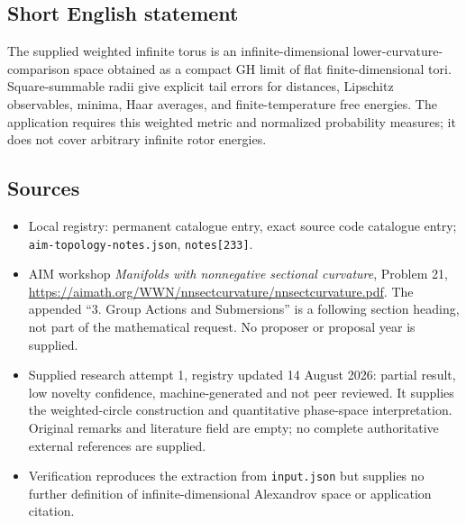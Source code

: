 \documentclass[11pt]{article}
\begin{document}
\subsection{Short English statement}
The supplied weighted infinite torus is an infinite-dimensional lower-curvature-comparison space obtained as a compact GH limit of flat finite-dimensional tori. Square-summable radii give explicit tail errors for distances, Lipschitz observables, minima, Haar averages, and finite-temperature free energies. The application requires this weighted metric and normalized probability measures; it does not cover arbitrary infinite rotor energies.
\subsection{Sources}
\begin{itemize}
\item Local registry: permanent catalogue entry, exact source code catalogue entry; \texttt{aim-topology-notes.json}, \texttt{notes[233]}.
\item AIM workshop \emph{Manifolds with nonnegative sectional curvature}, Problem 21, \url{https://aimath.org/WWN/nnsectcurvature/nnsectcurvature.pdf}. The appended ``3. Group Actions and Submersions'' is a following section heading, not part of the mathematical request. No proposer or proposal year is supplied.
\item Supplied research attempt 1, registry updated 14 August 2026: partial result, low novelty confidence, machine-generated and not peer reviewed. It supplies the weighted-circle construction and quantitative phase-space interpretation. Original remarks and literature field are empty; no complete authoritative external references are supplied.
\item Verification reproduces the extraction from \texttt{input.json} but supplies no further definition of infinite-dimensional Alexandrov space or application citation.
\end{itemize}
\end{document}
